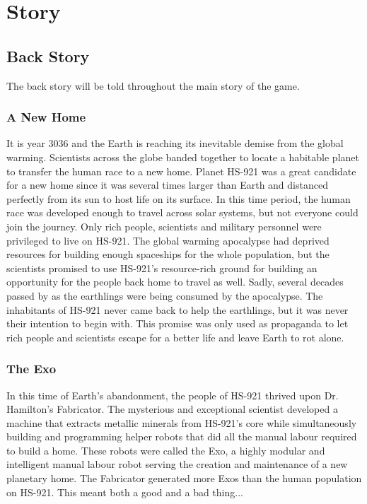 \documentclass[12pt]{article}
\begin{document}
\section{Story}

\subsection{Back Story}

The back story will be told throughout the main story of the game. 

\subsubsection{A New Home}

It is year 3036 and the Earth is reaching its inevitable demise from the global warming. Scientists across the globe banded together to locate a habitable planet to transfer the human race to a new home. Planet HS-921 was a great candidate for a new home since it was several times larger than Earth and distanced perfectly from its sun to host life on its surface. In this time period, the human race was  developed enough to travel across solar systems, but not everyone could join the journey. Only rich people, scientists and military personnel were privileged to live on HS-921. The global warming apocalypse had deprived resources for building enough spaceships for the whole population, but the scientists promised to use HS-921's resource-rich ground for building an opportunity for the people back home to travel as well. Sadly, several decades passed by as the earthlings were being consumed by the apocalypse. The inhabitants of HS-921 never came back to help the earthlings, but it was never their intention to begin with. This promise was only used as propaganda to let rich people and scientists escape for a better life and leave Earth to rot alone. 

\subsubsection{The Exo}

In this time of Earth's abandonment, the people of HS-921 thrived upon Dr. Hamilton's Fabricator. The mysterious and exceptional scientist developed a machine that extracts metallic minerals from HS-921's core while simultaneously building and programming helper robots that did all the manual labour required to build a home. These robots were called the Exo, a highly modular and intelligent manual labour robot serving the creation and maintenance of a new planetary home. The Fabricator generated more Exos than the human population on HS-921. This meant both a good and a bad thing...
\end{document}
